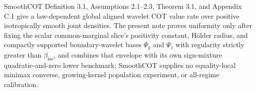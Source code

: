 SmoothCOT Definition 3.1, Assumptions 2.1--2.3, Theorem 3.1, and Appendix C.1 give a law-dependent global aligned wavelet COT value rate over positive isotropically smooth joint densities. The present note proves uniformity only after fixing the scalar common-marginal slice's positivity constant, H\"older radius, and compactly supported boundary-wavelet bases \(\Psi_y\) and \(\Psi_z\) with regularity strictly greater than \(\beta_{\mathrm{iso}}\), and combines that envelope with its own sign-mixture quadratic-and-zero lower benchmark; SmoothCOT supplies no equality-local minimax converse, growing-kernel population experiment, or all-regime calibration.